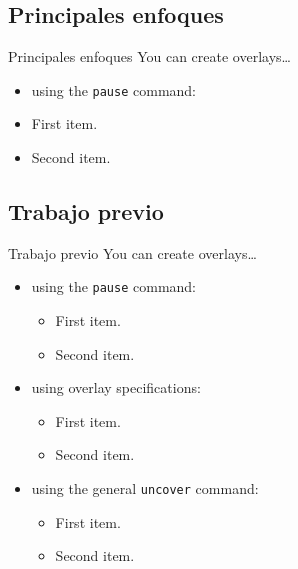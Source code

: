 \subsection{Principales enfoques}
\begin{frame}{Principales enfoques}
  You can create overlays\dots
  \begin{itemize}
    \item using the \texttt{pause} command:
    \item
      First item.
    \item    
      Second item.
  \end{itemize}
\end{frame}    

\subsection{Trabajo previo}
\begin{frame}{Trabajo previo}
  You can create overlays\dots
  \begin{itemize}
  \item using the \texttt{pause} command:
    \begin{itemize}
    \item
      First item.
    \item    
      Second item.
    \end{itemize}
  \item
    using overlay specifications:
    \begin{itemize}
    \item
      First item.
    \item
      Second item.
    \end{itemize}
  \item
    using the general \texttt{uncover} command:
    \begin{itemize}
      \item
        First item.
      \item
        Second item.
    \end{itemize}
  \end{itemize}
\end{frame}